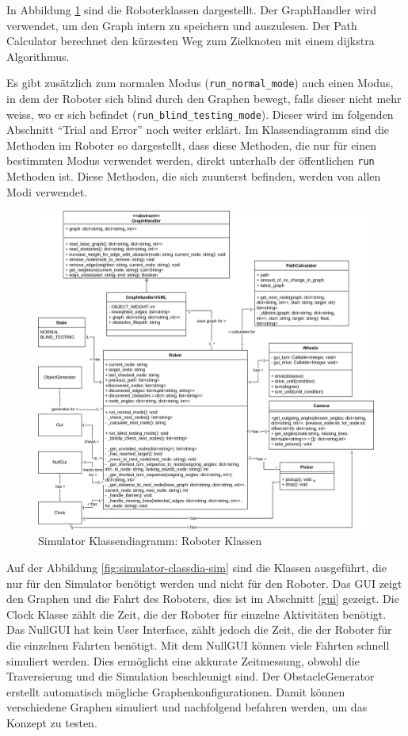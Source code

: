 In Abbildung \ref{fig:simulator-classdia-robot} sind die Roboterklassen dargestellt. Der GraphHandler wird verwendet, um den Graph intern zu speichern und auszulesen. Der Path Calculator berechnet den kürzesten Weg zum Zielknoten mit einem \gls{dijkstra} Algorithmus.

Es gibt zusätzlich zum normalen Modus (\verb|run_normal_mode|) auch einen Modus, in dem der Roboter sich blind durch den Graphen bewegt, falls dieser nicht mehr weiss, wo er sich befindet (\verb|run_blind_testing_mode|). Dieser wird im folgenden Abschnitt ``Trial and Error'' noch weiter erklärt. Im Klassendiagramm sind die Methoden im Roboter so dargestellt, dass diese Methoden, die nur für einen bestimmten Modus verwendet werden, direkt unterhalb der öffentlichen \verb|run| Methoden ist. Diese Methoden, die sich zuunterst befinden, werden von allen Modi verwendet. 

\begin{figure}[H]
\centering
\includegraphics[width=\textwidth]{assets/informatik-prototyp/simulator/simulator-robot-erd.png}
\caption{Simulator Klassendiagramm: Roboter Klassen}
\label{fig:simulator-classdia-robot}
\end{figure}

Auf der Abbildung \ref{fig:simulator-classdia-sim} sind die Klassen ausgeführt, die nur für den Simulator benötigt werden und nicht für den Roboter. Das GUI zeigt den Graphen und die Fahrt des Roboters, dies ist im Abschnitt \ref{gui} gezeigt. Die Clock Klasse zählt die Zeit, die der Roboter für einzelne Aktivitäten benötigt. Das NullGUI hat kein User Interface, zählt jedoch die Zeit, die der Roboter für die einzelnen Fahrten benötigt. Mit dem NullGUI können viele Fahrten schnell simuliert werden. Dies ermöglicht eine akkurate Zeitmessung, obwohl die Traversierung und die Simulation beschleunigt sind. Der ObstacleGenerator erstellt automatisch mögliche Graphenkonfigurationen. Damit können verschiedene Graphen simuliert und nachfolgend befahren werden, um das Konzept zu testen.


